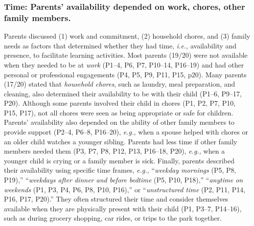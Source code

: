 \subsubsection{\textbf{Time:} Parents' availability depended on work, chores, other family members.}
Parents discussed (1) work and commitment, (2) household chores, and (3) family needs as factors that determined whether they had time, \textit{i.e.,} availability and presence, to facilitate learning activities. Most parents (19/20) were not available when they needed to be at \textit{work} (P1--4, P6, P7, P10--14, P16--19) and had other personal or professional engagements (P4, P5, P9, P11, P15, p20). Many parents (17/20) stated that \textit{household chores}, such as laundry, meal preparation, and cleaning, also determined their availability to be with their child (P1--6, P9--17, P20). Although some parents involved their child in chores (P1, P2, P7, P10, P15, P17), not all chores were seen as being appropriate or safe for children. Parents' availability also depended on the ability of other family members to provide support (P2--4, P6--8, P16--20), \textit{e.g.,} when a spouse helped with chores or an older child watches a younger sibling. Parents had less time if other family members needed them (P3, P7, P8, P12, P13, P16--18, P20), \textit{e.g.,} when a younger child is crying or a family member is sick. Finally, parents described their availability using specific time frames, \textit{e.g.,} ``\textit{weekday mornings} (P5, P8, P19),'' ``\textit{weekdays after dinner and before bedtime} (P5, P10, P18),'' ``\textit{anytime on weekends} (P1, P3, P4, P6, P8, P10, P16),'' or ``\textit{unstructured time} (P2, P11, P14, P16, P17, P20).'' They often structured their time and consider themselves available when they are physically present with their child (P1, P3--7, P14--16), such as during grocery shopping, car rides, or trips to the park together.



